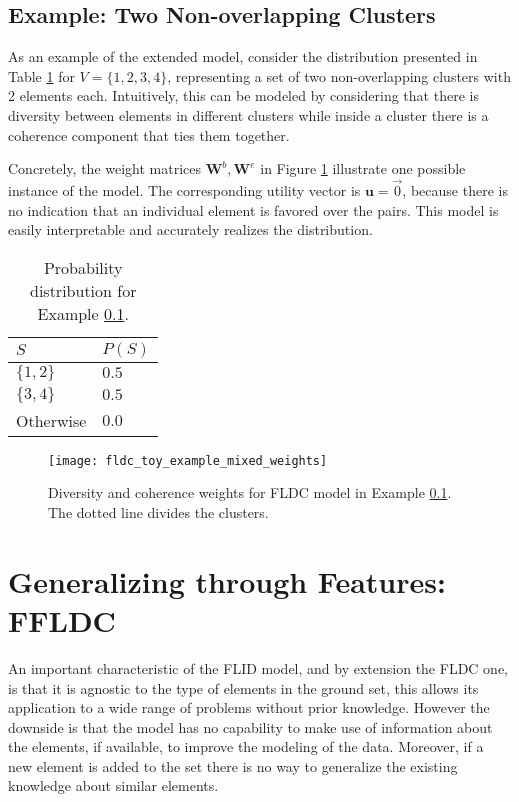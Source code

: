 \subsection{Example: Two Non-overlapping Clusters}
\label{sec:fldc-toy}

As an example of the extended model, consider the distribution presented in Table \ref{tab:fldc-toy-probs} for $V = \{1,2,3,4\}$, representing a set of two non-overlapping clusters with 2 elements each. Intuitively, this can be modeled by considering that there is diversity between elements in different clusters while inside a cluster there is a coherence component that ties them together.

Concretely, the weight matrices $\mathbf{W}^{b}, \mathbf{W}^{e}$ in Figure \ref{fig:fldc-toy-mixed-weights} illustrate one possible instance of the model. The corresponding utility vector is $\mathbf{u} = \overrightarrow{0}$, because there is no indication that an individual element is favored over the pairs. This model is easily interpretable and accurately realizes the distribution.

\begin{table}
  \centering
  \caption{Probability distribution for Example \ref{sec:fldc-toy}.}
  \begin{tabular}{@{}ll@{}}
    \toprule
    $S$ & $P(S)$  \\
    \midrule
    $\{1,2\}$ & $0.5$ \\
    $\{3,4\}$ & $0.5$ \\
    Otherwise & $0.0$ \\
    \bottomrule
  \end{tabular}
  \label{tab:fldc-toy-probs}
\end{table}

\begin{figure}
  \centering
  \texttt{[image: fldc\_toy\_example\_mixed\_weights]}
  \caption{Diversity and coherence weights for FLDC model in Example \ref{sec:fldc-toy}. The dotted line divides the clusters.}
  \label{fig:fldc-toy-mixed-weights}
\end{figure}

\section{Generalizing through Features: FFLDC}

An important characteristic of the FLID model, and by extension the FLDC one, is that it is agnostic to the type of elements in the ground set, this allows its application to a wide range of problems without prior knowledge. However the downside is that the model has no capability to make use of information about the elements, if available, to improve the modeling of the data. Moreover, if a new element is added to the set there is no way to generalize the existing knowledge about similar elements.

